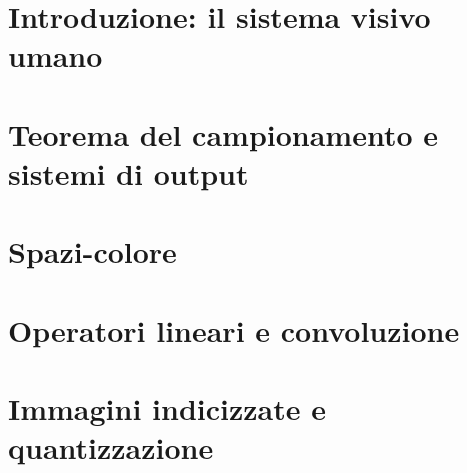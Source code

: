 \documentclass{article}
\begin{document}


\tableofcontents
\restoregeometry

\section{Introduzione: il sistema visivo umano}


\section{Teorema del campionamento e sistemi di output}


\section{Spazi-colore}


\section{Operatori lineari e convoluzione}


\section{Immagini indicizzate e quantizzazione}

\end{document}
